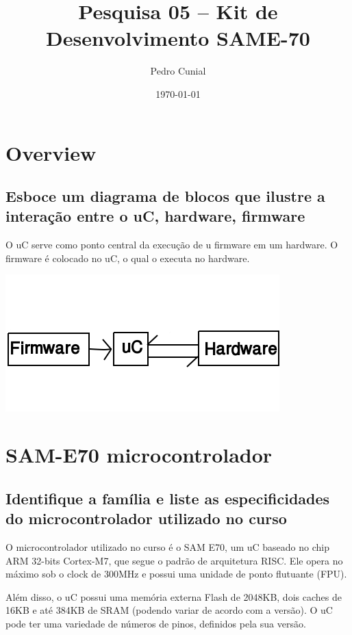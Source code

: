 \documentclass[11pt]{article}
\author{Pedro Cunial}
\date{\today}
\title{Pesquisa 05 -- Kit de Desenvolvimento SAME-70}
\begin{document}
\maketitle
\tableofcontents


\section{Overview}
\label{sec:orgheadline2}
\subsection{Esboce um diagrama de blocos que ilustre a interação entre o uC, hardware, firmware}
\label{sec:orgheadline1}
O uC serve como ponto central da execução de u firmware em um hardware. O firmware é colocado no uC, o qual o executa no hardware.

\includegraphics[width=\textwidth]{diagrama}

\section{SAM-E70 microcontrolador}
\label{sec:orgheadline3}
  \subsection{Identifique a família e liste as especificidades do
    microcontrolador utilizado no curso}
\label{sec:orgheadline4}
  O microcontrolador utilizado no curso é o SAM E70, um uC baseado no chip ARM
  32-bits Cortex-M7, que segue o padrão de arquitetura RISC. Ele opera no máximo
  sob o clock de 300MHz e possui uma unidade de ponto flutuante (FPU).

  Além disso, o uC possui uma memória externa Flash de 2048KB, dois caches de
  16KB e até 384KB de SRAM (podendo variar de acordo com a versão). O uC pode
  ter uma variedade de números de pinos, definidos pela sua versão.
\end{document}
